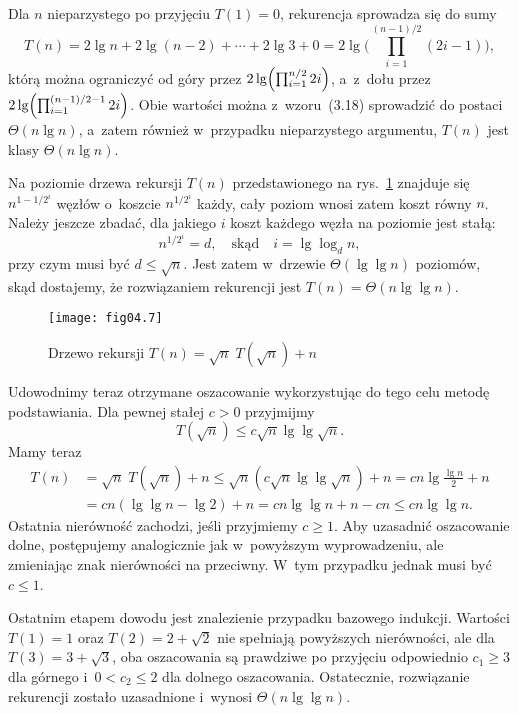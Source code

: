 Dla $n$ nieparzystego po przyjęciu $T(1)=0$, rekurencja sprowadza się do sumy
\[
    T(n) = 2\lg n+2\lg(n-2)+\cdots+2\lg3+0 = 2\lg\biggl(\prod_{i=1}^{(n-1)/2}(2i-1)\biggr),
\]
którą można ograniczyć od góry przez $2\lg\Bigl(\prod_{i=1}^{n/2}2i\Bigr)$, a~z~dołu przez $2\lg\Bigl(\prod_{i=1}^{(n-1)/2-1}2i\Bigr)$. Obie wartości można z~wzoru~(3.18) sprowadzić do postaci $\Theta(n\lg n)$, a~zatem również w~przypadku nieparzystego argumentu, $T(n)$ jest klasy $\Theta(n\lg n)$.

\subproblem %
Na  poziomie drzewa rekursji $T(n)$ przedstawionego na rys.~\ref{fig:4-4j} znajduje się $n^{1-1/2^i}$ węzłów o~koszcie $n^{1/2^i}$ każdy, cały poziom wnosi zatem koszt równy $n$. Należy jeszcze zbadać, dla jakiego $i$ koszt każdego węzła na  poziomie jest stałą:
\[
	n^{1/2^i} = d, \quad\text{skąd}\quad i = \lg\log_dn,
\]
przy czym musi być $d\le\sqrt{n}$. Jest zatem w~drzewie $\Theta(\lg\lg n)$ poziomów, skąd dostajemy, że rozwiązaniem rekurencji jest $T(n)=\Theta(n\lg\lg n)$.
\begin{figure}[ht]
	\begin{center}
		\texttt{[image: fig04.7]}
	\caption{Drzewo rekursji $T(n)=\sqrt{n}\;T(\!\sqrt{n})+n$} \label{fig:4-4j}
	\end{center}
\end{figure}

Udowodnimy teraz otrzymane oszacowanie wykorzystując do tego celu metodę podstawiania. Dla pewnej stałej $c>0$ przyjmijmy
\[
    T(\!\sqrt{n}) \le c\sqrt{n}\lg\lg\sqrt{n}.
\]
Mamy teraz
\begin{align*}
    T(n) &= \sqrt{n}\;T(\!\sqrt{n})+n \le \sqrt{n}\left(c\sqrt{n}\lg\lg\sqrt{n}\right)+n = cn\lg\frac{\lg n}{2}+n \\[1mm]
	&= cn(\lg\lg n-\lg2)+n = cn\lg\lg n+n-cn \le cn\lg\lg n.
\end{align*}
Ostatnia nierówność zachodzi, jeśli przyjmiemy $c\ge1$. Aby uzasadnić oszacowanie dolne, postępujemy analogicznie jak w~powyższym wyprowadzeniu, ale zmieniając znak nierówności na przeciwny. W~tym przypadku jednak musi być $c\le1$.

Ostatnim etapem dowodu jest znalezienie przypadku bazowego indukcji. Wartości $T(1)=1$ oraz $T(2)=2+\sqrt{2}$ nie spełniają powyższych nierówności, ale dla $T(3)=3+\sqrt{3}$, oba oszacowania są prawdziwe po przyjęciu odpowiednio $c_1\ge3$ dla górnego i~$0<c_2\le2$ dla dolnego oszacowania. Ostatecznie, rozwiązanie rekurencji zostało uzasadnione i~wynosi $\Theta(n\lg\lg n)$.

